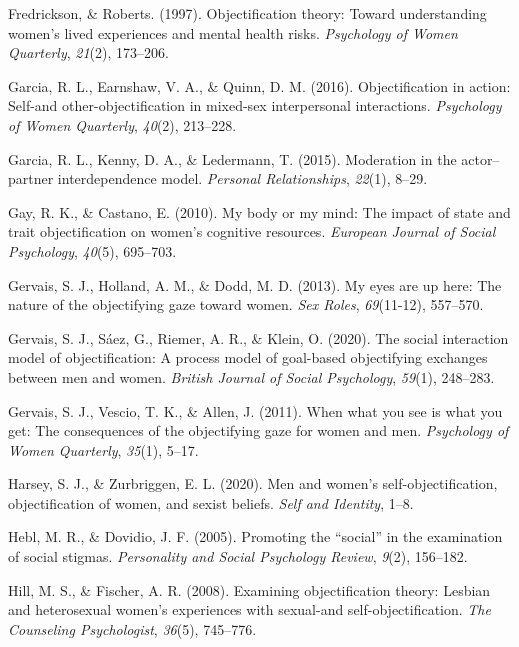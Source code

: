 \documentclass[man]{apa6}
\begin{document}
\hypertarget{ref-robertsfredrickson}{}
Fredrickson, \& Roberts. (1997). Objectification theory: Toward
understanding women's lived experiences and mental health risks.
\emph{Psychology of Women Quarterly}, \emph{21}(2), 173--206.

\hypertarget{ref-garcia2016objectification}{}
Garcia, R. L., Earnshaw, V. A., \& Quinn, D. M. (2016). Objectification
in action: Self-and other-objectification in mixed-sex interpersonal
interactions. \emph{Psychology of Women Quarterly}, \emph{40}(2),
213--228.

\hypertarget{ref-garcia2015moderation}{}
Garcia, R. L., Kenny, D. A., \& Ledermann, T. (2015). Moderation in the
actor--partner interdependence model. \emph{Personal Relationships},
\emph{22}(1), 8--29.

\hypertarget{ref-gay2010my}{}
Gay, R. K., \& Castano, E. (2010). My body or my mind: The impact of
state and trait objectification on women's cognitive resources.
\emph{European Journal of Social Psychology}, \emph{40}(5), 695--703.

\hypertarget{ref-gervais2013my}{}
Gervais, S. J., Holland, A. M., \& Dodd, M. D. (2013). My eyes are up
here: The nature of the objectifying gaze toward women. \emph{Sex
Roles}, \emph{69}(11-12), 557--570.

\hypertarget{ref-gervais2020social}{}
Gervais, S. J., Sáez, G., Riemer, A. R., \& Klein, O. (2020). The social
interaction model of objectification: A process model of goal-based
objectifying exchanges between men and women. \emph{British Journal of
Social Psychology}, \emph{59}(1), 248--283.

\hypertarget{ref-gervais2011you}{}
Gervais, S. J., Vescio, T. K., \& Allen, J. (2011). When what you see is
what you get: The consequences of the objectifying gaze for women and
men. \emph{Psychology of Women Quarterly}, \emph{35}(1), 5--17.

\hypertarget{ref-harsey2020men}{}
Harsey, S. J., \& Zurbriggen, E. L. (2020). Men and women's
self-objectification, objectification of women, and sexist beliefs.
\emph{Self and Identity}, 1--8.

\hypertarget{ref-hebl2005promoting}{}
Hebl, M. R., \& Dovidio, J. F. (2005). Promoting the ``social'' in the
examination of social stigmas. \emph{Personality and Social Psychology
Review}, \emph{9}(2), 156--182.

\hypertarget{ref-hill2008examining}{}
Hill, M. S., \& Fischer, A. R. (2008). Examining objectification theory:
Lesbian and heterosexual women's experiences with sexual-and
self-objectification. \emph{The Counseling Psychologist}, \emph{36}(5),
745--776.
\end{document}
